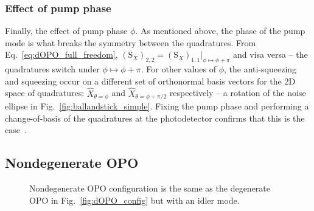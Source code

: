 \subsubsection{Effect of pump phase}

Finally, the effect of pump phase $\phi$. As mentioned above, the phase of the pump mode is what breaks the symmetry between the quadratures. From Eq.~\ref{eq:dOPO_full_freedom}, $(\text{S}_X)_{2,2}=(\text{S}_X)_{1,1}|_{\phi\mapsto\phi+\pi}$ and visa versa -- the quadratures switch under $\phi\mapsto\phi+\pi$. For other values of $\phi$, the anti-squeezing and squeezing occur on a different set of orthonormal basis vectors for the 2D space of quadratures: $\hat{X}_{\theta=\phi}$ and $\hat{X}_{\theta=\phi+\pi/2}$ respectively  -- a rotation of the noise ellipse in Fig.~\ref{fig:ballandstick_simple}. 
Fixing the pump phase and performing a change-of-basis of the quadratures at the photodetector confirms that this is the case~\cite{}.




\subsection{Nondegenerate OPO}

\begin{figure}
	\centering
	\caption{Nondegenerate OPO configuration is the same as the degenerate OPO in Fig.~\ref{fig:dOPO_config} but with an idler mode.}
	\label{fig:nOPO_config}
\end{figure}

